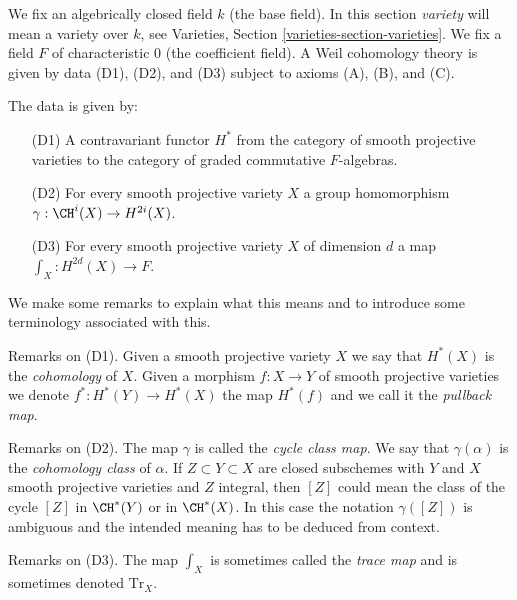 \medskip\noindent
We fix an algebrically closed field $k$ (the base field).
In this section {\it variety} will mean a variety over $k$, see
Varieties, Section \ref{varieties-section-varieties}.
We fix a field $F$ of characteristic $0$ (the coefficient field).
A Weil cohomology theory is given by data (D1), (D2), and (D3)
subject to axioms (A), (B), and (C).

\medskip\noindent
The data is given by:
\begin{enumerate}
\item[(D1)] A contravariant functor $H^*$ from the category
of smooth projective varieties to the category of
graded commutative $F$-algebras.
\item[(D2)] For every smooth projective variety $X$
a group homomorphism $\gamma : \CH^i(X) \to H^{2i}(X)$.
\item[(D3)] For every smooth projective variety $X$ of dimension $d$
a map $\int_X : H^{2d}(X) \to F$.
\end{enumerate}
We make some remarks to explain what this means and to introduce
some terminology associated with this.

\medskip\noindent
Remarks on (D1). Given a smooth projective variety $X$
we say that $H^*(X)$ is the {\it cohomology} of $X$. Given a morphism
$f : X \to Y$ of smooth projective varieties we denote
$f^* : H^*(Y) \to H^*(X)$ the map $H^*(f)$ and we call it the
{\it pullback map}.

\medskip\noindent
Remarks on (D2). The map $\gamma$ is called the {\it cycle class map}.
We say that $\gamma(\alpha)$ is the {\it cohomology class} of $\alpha$.
If $Z \subset Y \subset X$ are closed subschemes with $Y$ and $X$
smooth projective varieties and $Z$ integral, then $[Z]$ could
mean the class of the cycle $[Z]$ in $\CH^*(Y)$ or in $\CH^*(X)$.
In this case the notation $\gamma([Z])$ is ambiguous and the intended meaning
has to be deduced from context.

\medskip\noindent
Remarks on (D3). The map $\int_X$ is sometimes called the
{\it trace map} and is sometimes denoted $\text{Tr}_X$.

